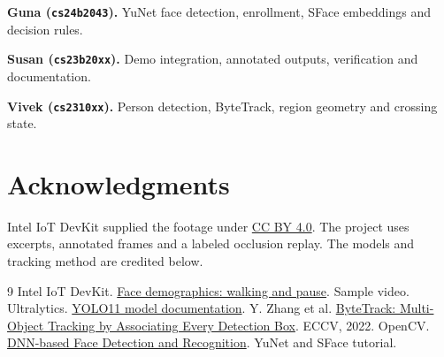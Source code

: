 \documentclass[11pt,a4paper]{article}
\begin{document}
\noindent\textbf{Guna (\texttt{cs24b2043}).} YuNet face detection, enrollment, SFace embeddings and decision rules.

\noindent\textbf{Susan (\texttt{cs23b20xx}).} Demo integration, annotated outputs, verification and documentation.

\noindent\textbf{Vivek (\texttt{cs2310xx}).} Person detection, ByteTrack, region geometry and crossing state.

\section*{Acknowledgments}

Intel IoT DevKit supplied the footage under \href{https://creativecommons.org/licenses/by/4.0/}{CC BY 4.0}. The project uses excerpts, annotated frames and a labeled occlusion replay. The models and tracking method are credited below.

\begin{thebibliography}{9}
 Intel IoT DevKit. \href{https://github.com/intel-iot-devkit/sample-videos/blob/master/face-demographics-walking-and-pause.mp4}{Face demographics: walking and pause}. Sample video.
 Ultralytics. \href{https://docs.ultralytics.com/models/yolo11/}{YOLO11 model documentation}.
 Y. Zhang et al. \href{https://arxiv.org/abs/2110.06864}{ByteTrack: Multi-Object Tracking by Associating Every Detection Box}. ECCV, 2022.
 OpenCV. \href{https://docs.opencv.org/4.x/d0/dd4/tutorial_dnn_face.html}{DNN-based Face Detection and Recognition}. YuNet and SFace tutorial.
\end{thebibliography}
\end{document}
